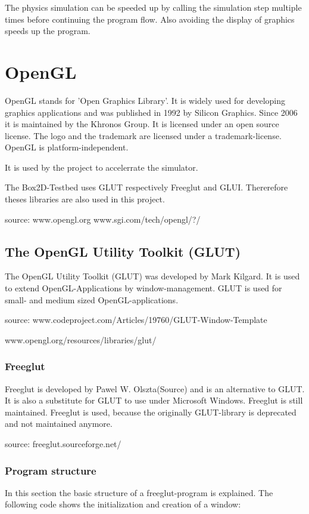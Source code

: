 \documentclass[10pt,a4paper,DIV=11]{scrreprt}
\begin{document}
The physics simulation can be speeded up by calling the simulation step multiple times before continuing the program flow. Also avoiding the display of graphics speeds up the program.


\chapter{OpenGL}
OpenGL stands for 'Open Graphics Library'. It is widely used for developing graphics applications and was published in 1992 by Silicon Graphics. Since 2006 it is maintained by the Khronos Group. It is licensed under an open source license. The logo and the trademark are licensed under a trademark-license.
OpenGL is platform-independent.


It is used by the project to accelerrate the simulator.

The Box2D-Testbed uses GLUT respectively Freeglut and GLUI. Thererefore theses libraries are also used in this project.

source: www.opengl.org
www.sgi.com/tech/opengl/?/


\section{The OpenGL Utility Toolkit (GLUT)}
The OpenGL Utility Toolkit (GLUT) was developed by Mark Kilgard. It is used to extend OpenGL-Applications by window-management. GLUT is used for small- and medium sized OpenGL-applications.

source: www.codeproject.com/Articles/19760/GLUT-Window-Template

www.opengl.org/resources/libraries/glut/

\subsection{Freeglut}
Freeglut is developed by Pawel W. Olszta(Source) and is an alternative to GLUT. It is also a substitute for GLUT to use under Microsoft Windows. Freeglut is still maintained. Freeglut is used, because the originally GLUT-library is deprecated and not maintained anymore.

source: freeglut.sourceforge.net/

\subsection{Program structure}
In this section the basic structure of a freeglut-program is explained.
The following code shows the initialization and creation of a window:
\end{document}

